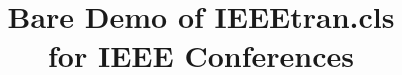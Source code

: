 \documentclass[conference]{IEEEtran}
\DeclareRobustCommand*{\IEEEauthorrefmark}[1]{%
\raisebox{0pt}[0pt][0pt]{\textsuperscript{\footnotesize\ensuremath{#1}}}}
\begin{document}
%
\title{Bare Demo of IEEEtran.cls\\ for IEEE Conferences}



%
\end{document}
